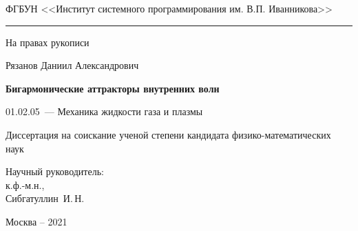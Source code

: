 \thispagestyle{empty}

{
\singlespacing
\begin{center}
ФГБУН <<Институт системного программирования им. В.П. Иванникова>>
\medskip
\hrule
\medskip

\end{center}

\vspace{20mm}
\begin{flushright}
На правах рукописи

\end{flushright}

\vspace{25mm}
\begin{center}
{\large Рязанов Даниил Александрович}
\end{center}

\vspace{5mm}
\begin{center}
{\bf \large Бигармонические аттракторы внутренних волн 
\par}

\vspace{10mm}
{
01.02.05~--- Механика жидкости газа и плазмы
}





\vspace{10mm}
Диссертация на соискание ученой степени кандидата физико-математических наук
\end{center}

\vspace{16mm}
\begin{flushright}
Научный руководитель:\\[2mm]
к.ф.-м.н., \\
Сибгатуллин~И.\,Н.\\

\end{flushright}

\vfill
\begin{center}
{Москва -- 2021}
\end{center}
}
\newpage
\restoregeometry